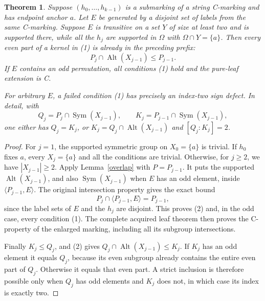 \documentclass[11pt,a4paper]{article}
\newtheorem{theorem}[lemma]{Theorem}
\newcommand{\gen}[1]{\langle#1\rangle}
\newcommand{\Sym}{\operatorname{Sym}}
\newcommand{\Alt}{\operatorname{Alt}}
\begin{document}
\begin{theorem}\label{kernels}
Suppose $(h_0,\ldots,h_{k-1})$ is a submarking of a string
C-marking and has endpoint anchor $a$. Let $E$ be generated by
a disjoint set of labels from the same C-marking. Suppose $E$ is
transitive on a set $Y$ of size at least two and is supported there,
while all the $h_j$ are supported in $\Omega$ with
$\Omega\cap Y=\{a\}$. Then every even part of a kernel in (1)
is already in the preceding prefix:
\[
 P_j\cap\Alt(X_{j-1})\le P_{j-1}.                    \tag{2}
\]
If $E$ contains an odd permutation, all conditions (1) hold and
the pure-leaf extension is C.

For arbitrary $E$, a failed condition (1) has precisely an index-two
sign defect. In detail, with
\[
 Q_j=P_j\cap\Sym(X_{j-1}),\qquad
 K_j=P_{j-1}\cap\Sym(X_{j-1}),
\]
one either has $Q_j=K_j$, or
$K_j=Q_j\cap\Alt(X_{j-1})$ and $[Q_j:K_j]=2$.
\end{theorem}
\begin{proof}
For $j=1$, the supported symmetric group on $X_0=\{a\}$
is trivial. If $h_0$ fixes $a$, every $X_j=\{a\}$ and all the conditions
are trivial. Otherwise, for $j\ge2$, we have $|X_{j-1}|\ge2$. Apply Lemma~\ref{overlap} with $P=P_{j-1}$.
It puts the supported $\Alt(X_{j-1})$, and also
$\Sym(X_{j-1})$ when $E$ has an odd element, inside
$\gen{P_{j-1},E}$.
The original intersection property gives the exact bound
\[
 P_j\cap\gen{P_{j-1},E}=P_{j-1},
\]
since the label sets of $E$ and the $h_j$ are disjoint.
This proves (2) and, in the odd case, every condition (1).
The complete acquired leaf theorem then proves the C-property of
the enlarged marking, including all its subgroup intersections.

Finally $K_j\le Q_j$, and (2) gives
$Q_j\cap\Alt(X_{j-1})\le K_j$.
If $K_j$ has an odd element it equals $Q_j$, because its even
subgroup already contains the entire even part of $Q_j$.
Otherwise it equals that even part. A strict inclusion is therefore
possible only when $Q_j$ has odd elements and $K_j$ does not,
in which case its index is exactly two.
\end{proof}
\end{document}
